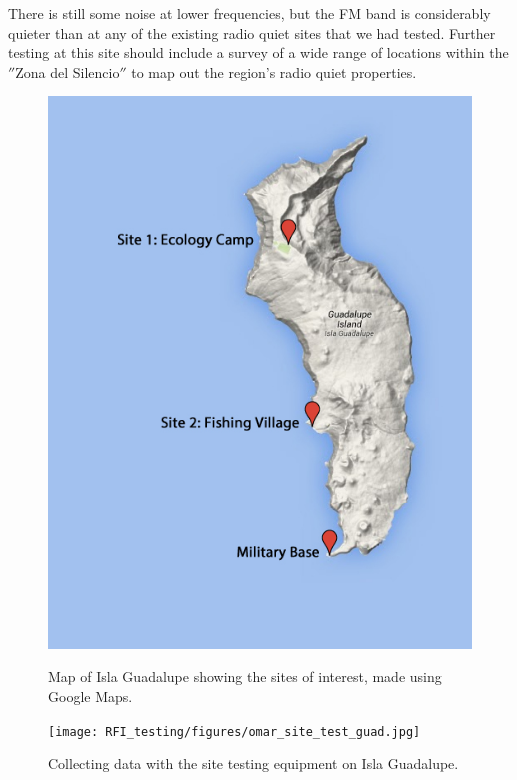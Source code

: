There is still some noise at lower frequencies, but the FM band is considerably quieter than at any of the existing radio quiet sites that we had tested. Further testing at this site should include a survey of a wide range of locations within the $''$Zona del Silencio$''$ to map out the region's radio quiet properties. 

\begin{figure}[htb]
\centering
\begin{minipage}[b]{0.47\textwidth}
\centering
\includegraphics[width=0.93\linewidth]{RFI_testing/figures/isla_guadalupe_site_map.jpg}
\caption{Map of Isla Guadalupe showing the sites of interest, made using Google Maps. }
\label{Fig:guadmap}
\end{minipage}%
\begin{minipage}[b]{0.02\textwidth}
\hspace{1cm}
\end{minipage}%
\begin{minipage}[b]{0.47\textwidth}
\centering
\texttt{[image: RFI\_testing/figures/omar\_site\_test\_guad.jpg]}
\caption{Collecting data with the site testing equipment on Isla Guadalupe.}
\label{Fig:guadsite}
\end{minipage}
\end{figure}



